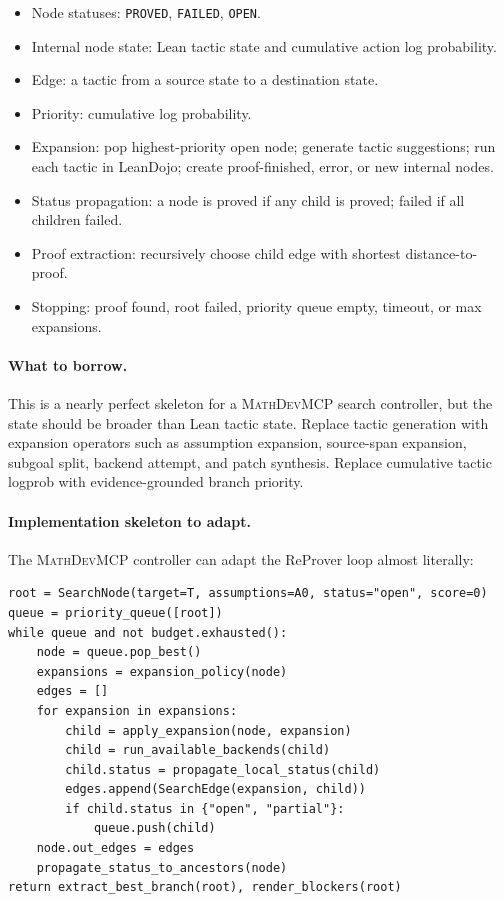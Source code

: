 \documentclass[11pt]{article}
\newcommand{\MathDevMCP}{\textsc{MathDevMCP}}
\begin{document}
\begin{itemize}[leftmargin=*]
\item Node statuses: \texttt{PROVED}, \texttt{FAILED}, \texttt{OPEN}.
\item Internal node state: Lean tactic state and cumulative action log
  probability.
\item Edge: a tactic from a source state to a destination state.
\item Priority: cumulative log probability.
\item Expansion: pop highest-priority open node; generate tactic suggestions;
  run each tactic in LeanDojo; create proof-finished, error, or new internal
  nodes.
\item Status propagation: a node is proved if any child is proved; failed if
  all children failed.
\item Proof extraction: recursively choose child edge with shortest
  distance-to-proof.
\item Stopping: proof found, root failed, priority queue empty, timeout, or max
  expansions.
\end{itemize}

\paragraph{What to borrow.}
This is a nearly perfect skeleton for a \MathDevMCP{} search controller, but
the state should be broader than Lean tactic state. Replace tactic generation
with expansion operators such as assumption expansion, source-span expansion,
subgoal split, backend attempt, and patch synthesis. Replace cumulative tactic
logprob with evidence-grounded branch priority.

\paragraph{Implementation skeleton to adapt.}
The \MathDevMCP{} controller can adapt the ReProver loop almost literally:

\begin{verbatim}
root = SearchNode(target=T, assumptions=A0, status="open", score=0)
queue = priority_queue([root])
while queue and not budget.exhausted():
    node = queue.pop_best()
    expansions = expansion_policy(node)
    edges = []
    for expansion in expansions:
        child = apply_expansion(node, expansion)
        child = run_available_backends(child)
        child.status = propagate_local_status(child)
        edges.append(SearchEdge(expansion, child))
        if child.status in {"open", "partial"}:
            queue.push(child)
    node.out_edges = edges
    propagate_status_to_ancestors(node)
return extract_best_branch(root), render_blockers(root)
\end{verbatim}
\end{document}
